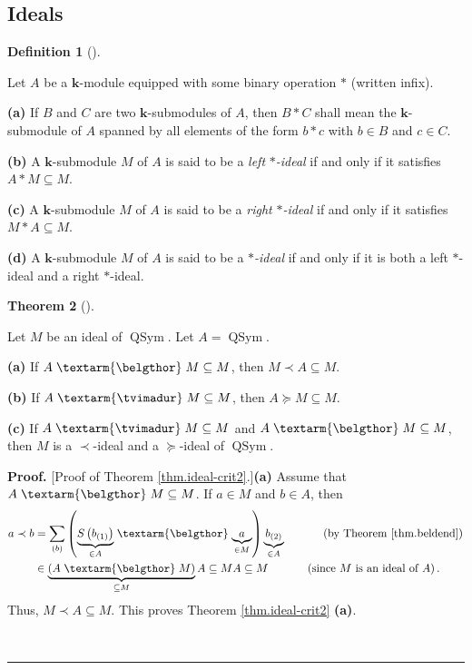 \documentclass[numbers=enddot,12pt,final,onecolumn,notitlepage]{scrartcl}%
\theoremstyle{definition}
\newtheorem{theo}{Theorem}[section]
\newenvironment{theorem}[1][]
{\begin{theo}[#1]\begin{leftbar}}
{\end{leftbar}\end{theo}}
\newtheorem{defi}[theo]{Definition}
\newenvironment{definition}[1][]
{\begin{defi}[#1]\begin{leftbar}}
{\end{leftbar}\end{defi}}
\newenvironment{proof}[1][Proof]{\noindent\textbf{#1.} }{\ \rule{0.5em}{0.5em}}
\newenvironment{verlong}{}{}
\newcommand{\tvi}{\left. \textarm{\tvimadur} \right.}
\newcommand{\bel}{\left. \textarm{\belgthor} \right.}
\let\sumnonlimits\sum
\renewcommand{\sum}{\sumnonlimits\limits}
\begin{document}
\begin{verlong}
\subsection{Ideals}

\begin{definition}
Let $A$ be a $\mathbf{k}$-module equipped with some binary operation $\ast$
(written infix).

\textbf{(a)} If $B$ and $C$ are two $\mathbf{k}$-submodules of $A$, then
$B\ast C$ shall mean the $\mathbf{k}$-submodule of $A$ spanned by all elements
of the form $b\ast c$ with $b\in B$ and $c\in C$.

\textbf{(b)} A $\mathbf{k}$-submodule $M$ of $A$ is said to be a \textit{left
}$\ast$\textit{-ideal} if and only if it satisfies $A\ast M\subseteq M$.

\textbf{(c)} A $\mathbf{k}$-submodule $M$ of $A$ is said to be a \textit{right
}$\ast$\textit{-ideal} if and only if it satisfies $M\ast A\subseteq M$.

\textbf{(d)} A $\mathbf{k}$-submodule $M$ of $A$ is said to be a\textit{
}$\ast$\textit{-ideal} if and only if it is both a left $\ast$-ideal and a
right $\ast$-ideal.
\end{definition}

\begin{theorem}
\label{thm.ideal-crit2}Let $M$ be an ideal of $\operatorname*{QSym}$. Let
$A=\operatorname*{QSym}$.

\textbf{(a)} If $A\bel  M\subseteq M$, then $M\left.  \prec\right.  A\subseteq
M$.

\textbf{(b)} If $A\tvi  M\subseteq M$, then $A\left.  \succeq\right.
M\subseteq M$.

\textbf{(c)} If $A\tvi  M\subseteq M$ and $A\bel  M\subseteq M$, then $M$ is a
$\left.  \prec\right.  $-ideal and a $\left.  \succeq\right.  $-ideal of
$\operatorname*{QSym}$.
\end{theorem}

\begin{proof}
[Proof of Theorem \ref{thm.ideal-crit2}.]\textbf{(a)} Assume that
$A\bel  M\subseteq M$. If $a\in M$ and $b\in A$, then%
\begin{align*}
a\left.  \prec\right.  b  &  =\sum_{\left(  b\right)  }\left(
\underbrace{S\left(  b_{\left(  1\right)  }\right)  }_{\in A}%
\bel \underbrace{a}_{\in M}\right)  \underbrace{b_{\left(  2\right)  }}_{\in
A}\ \ \ \ \ \ \ \ \ \ \left(  \text{by Theorem \ref{thm.beldend}}\right) \\
&  \in\underbrace{\left(  A\bel M\right)  }_{\subseteq M}A\subseteq
MA\subseteq M\ \ \ \ \ \ \ \ \ \ \left(  \text{since }M\text{ is an ideal of
}A\right)  .
\end{align*}
Thus, $M\left.  \prec\right.  A\subseteq M$. This proves Theorem
\ref{thm.ideal-crit2} \textbf{(a)}.


\end{proof}
\end{verlong}
\end{document}
